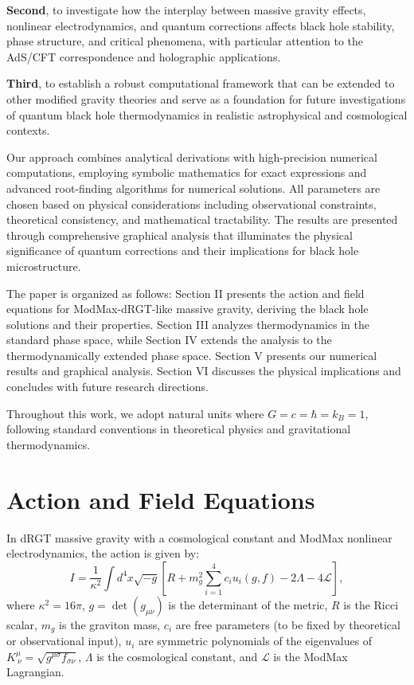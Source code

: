 \documentclass[12pt]{article}
\begin{document}
\textbf{Second}, to investigate how the interplay between massive gravity effects, nonlinear electrodynamics, and quantum corrections affects black hole stability, phase structure, and critical phenomena, with particular attention to the AdS/CFT correspondence and holographic applications.

\textbf{Third}, to establish a robust computational framework that can be extended to other modified gravity theories and serve as a foundation for future investigations of quantum black hole thermodynamics in realistic astrophysical and cosmological contexts.

Our approach combines analytical derivations with high-precision numerical computations, employing symbolic mathematics for exact expressions and advanced root-finding algorithms for numerical solutions. All parameters are chosen based on physical considerations including observational constraints, theoretical consistency, and mathematical tractability. The results are presented through comprehensive graphical analysis that illuminates the physical significance of quantum corrections and their implications for black hole microstructure.

The paper is organized as follows: Section II presents the action and field equations for ModMax-dRGT-like massive gravity, deriving the black hole solutions and their properties. Section III analyzes thermodynamics in the standard phase space, while Section IV extends the analysis to the thermodynamically extended phase space. Section V presents our numerical results and graphical analysis. Section VI discusses the physical implications and concludes with future research directions.

Throughout this work, we adopt natural units where $G = c = \hbar = k_B = 1$, following standard conventions in theoretical physics and gravitational thermodynamics.

\section{Action and Field Equations}
In dRGT massive gravity with a cosmological constant and ModMax nonlinear electrodynamics, the action is given by:
\begin{equation}
I = \frac{1}{\kappa^2} \int d^4x \sqrt{-g} \left[ R + m_g^2 \sum_{i=1}^4 c_i u_i(g, f) - 2\Lambda - 4\mathcal{L} \right],
\end{equation}
where $\kappa^2 = 16\pi$, $g = \det(g_{\mu\nu})$ is the determinant of the metric, $R$ is the Ricci scalar, $m_g$ is the graviton mass, $c_i$ are free parameters (to be fixed by theoretical or observational input), $u_i$ are symmetric polynomials of the eigenvalues of $K^\mu_{\ \nu} = \sqrt{g^{\mu\sigma} f_{\sigma\nu}}$, $\Lambda$ is the cosmological constant, and $\mathcal{L}$ is the ModMax Lagrangian.
\end{document}
